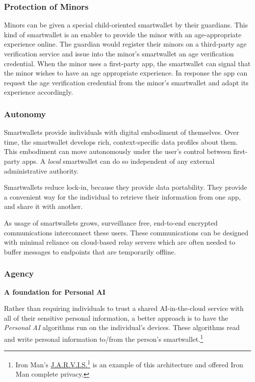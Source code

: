 \documentclass[11pt, oneside]{article}   	%
\newcommand{\hyperfootnote}[1][]{\def\ArgI{{#1}}\hyperfootnoteRelay}
\newcommand\hyperfootnoteRelay[2][]{\href{#1#2}{\ArgI}\footnote{\href{#1#2}{#2}}}
\begin{document}
\subsubsection{Protection of Minors}

Minors can be given a special child-oriented smartwallet by their guardians. This kind of smartwallet is an enabler to  provide the minor with an age-appropriate experience online. The guardian would register their minors on a third-party age verification service and issue into the minor's smartwallet an age verification credential. When the minor uses a first-party app, the smartwallet can signal that the minor wishes to have an age appropriate experience. In response the app can request the age verification credential from the minor's smartwallet and adapt its experience accordingly.

\subsubsection{Autonomy}

Smartwallets provide individuals with digital embodiment of themselves. Over time, the smartwallet develops rich, context-specific data profiles about them. This embodiment can move autonomously under the user's control between first-party apps. A \emph{local} smartwallet can do so independent of any external administrative authority. 

Smartwallets reduce lock-in, because they provide data portability. They provide a convenient way for the individual to retrieve their information from one app, and share it with another. 

As usage of smartwallets grows, surveillance free, end-to-end encrypted communications interconnect these users. These communications can be designed with minimal reliance on cloud-based relay servers which are often needed to buffer messages to endpoints that are temporarily offline.

\subsubsection{Agency}

\textbf{A foundation for Personal AI}

Rather than requiring individuals to trust a shared AI-in-the-cloud service with all of their sensitive personal information, a better approach is to have the \emph{Personal AI} algorithms run on the individual's devices. These algorithms read and write personal information to/from the person's smartwallet.\footnote{Iron Man's \hyperfootnote[J.A.R.V.I.S.][https://]{en.wikipedia.org/wiki/J.A.R.V.I.S.} is an example of this architecture and offered Iron Man complete privacy.}
\end{document}
